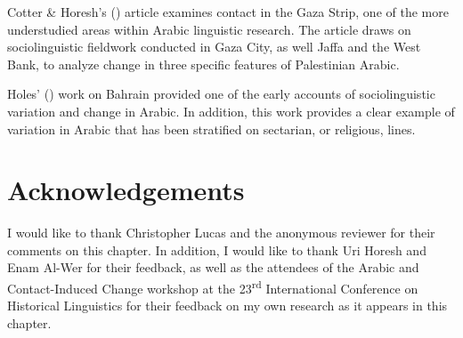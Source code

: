 \documentclass[output=paper]{langsci/langscibook}
\begin{document}
Cotter \& Horesh’s (\citeyear{CotterHoresh2015}) article examines contact in the Gaza Strip, one of the more understudied areas within Arabic linguistic research. The article draws on sociolinguistic fieldwork conducted in Gaza City, as well Jaffa and the West Bank, to analyze change in three specific features of Palestinian Arabic.

Holes' (\citeyear{Holes1987}) work on Bahrain provided one of the early accounts of sociolinguistic variation and change in Arabic. In addition, this work provides a clear example of variation in Arabic that has been stratified on sectarian, or religious, lines. 

\section*{Acknowledgements}

I would like to thank Christopher Lucas and the anonymous reviewer for their comments on this chapter. In addition, I would like to thank Uri Horesh and Enam Al-Wer for their feedback, as well as the attendees of the Arabic and Contact-Induced Change workshop at the 23\textsuperscript{rd} International Conference on Historical Linguistics for their feedback on my own research as it appears in this chapter. 



\sloppy
\printbibliography[heading=subbibliography,notkeyword=this]
\end{document}
